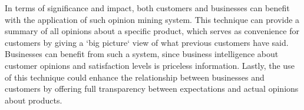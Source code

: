 \documentclass{sig-alternate}
\begin{document}
In terms of significance and impact, both customers and businesses can benefit with the application of such opinion mining system. This technique can provide a summary of all opinions about a specific product, which serves as convenience for customers by giving a `big picture` view of what previous customers have said. Businesses can benefit from such a system, since business intelligence about customer opinions and satisfaction levels is priceless information. Lastly, the use of this technique could enhance the relationship between businesses and customers by offering full transparency between expectations and actual opinions about products.

%




%
%
\end{document}
